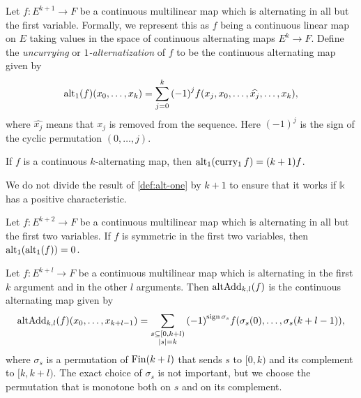\begin{definition}%
  \label{def:alt-one}
  Let \(f\colon E^{k + 1}\to F\) be a continuous multilinear map which is alternating in all but the first variable.
  Formally, we represent this as \(f\) being a continuous linear map on \(E\) taking values in the space of continuous alternating maps \(E^{k}\to F\).
  Define the \emph{uncurrying} or \emph{\(1\)-alternatization} of \(f\) to be the continuous alternating map given by
  \[
    \operatorname{alt_1}(f)(x_{0}, \dots, x_{k}) = \sum_{j=0}^{k}{(-1)}^{j}f(x_{j}, x_{0}, \dots, \widehat{x_{j}}, \dots, x_{k}),
  \]
  where \(\widehat{x_{j}}\) means that \(x_{j}\) is removed from the sequence.
  Here \({(-1)}^{j}\) is the sign of the cyclic permutation \((0, \dots, j)\).
\end{definition}

\begin{theorem}
  If \(f\) is a continuous \(k\)-alternating map, then \(\operatorname{alt_1}(\operatorname{curry_1} f) = (k + 1)f\).
\end{theorem}

\begin{remark}
  We do not divide the result of \autoref{def:alt-one} by \(k + 1\)
  to ensure that it works if \(\mathbb k\) has a positive characteristic.%
\end{remark}

\begin{theorem}
  Let \(f\colon E^{k + 2}\to F\) be a continuous multilinear map which is alternating in all but the first two variables.
  If \(f\) is symmetric in the first two variables, then \(\operatorname{alt_1}(\operatorname{alt_1}(f)) = 0\).
\end{theorem}


\begin{definition}
  Let \(f\colon E^{k + l}\to F\) be a continuous multilinear map
  which is alternating in the first \(k\) argument and in the other \(l\) arguments.
  Then \(\operatorname{altAdd}_{k,l}(f)\) is the continuous alternating map given by
  \[
    \operatorname{altAdd}_{k,l}(f)(x_{0}, \dots, x_{k + l - 1})=\sum_{\substack{s\subseteq [0, k + l)\\|s|=k}}{(-1)}^{\operatorname{sign} \sigma_{s}}f(\sigma_{s}(0), \dots, \sigma_{s}(k + l - 1)),
  \]
  where \(\sigma_{s}\) is a permutation of \(\operatorname{Fin} (k + l)\) that sends \(s\) to \([0, k)\) and its complement to \([k, k + l)\).
  The exact choice of \(\sigma_{s}\) is not important, but we choose the permutation that is monotone both on \(s\) and on its complement.
\end{definition}

